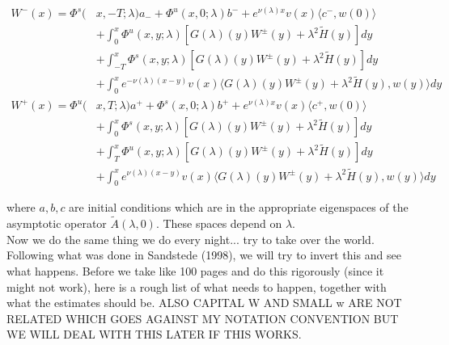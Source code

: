 \documentclass[12pt]{article}
\begin{document}
\begin{align*}
W^-(x) = \Phi^s(&x, -T; \lambda)a_- + \Phi^u(x, 0; \lambda)b^- + e^{\nu(\lambda)x} v(x) \langle c^-, w(0) \rangle  \\
&+ \int_0^x \Phi^u(x, y; \lambda)[ G(\lambda)(y)W^\pm(y) + \lambda^2 \tilde{H}(y) ] dy \\
&+ \int_{-T}^x \Phi^s(x, y; \lambda) [ G(\lambda)(y)W^\pm(y) + \lambda^2 \tilde{H}(y) ] dy \\
&+ \int_0^x 
e^{-\nu(\lambda)(x-y)} v(x) \langle G(\lambda)(y)W^\pm(y) + \lambda^2 \tilde{H}(y), w(y) \rangle dy \\
W^+(x) = \Phi^u(&x, T; \lambda)a^+ + \Phi^s(x, 0; \lambda)b^+ + e^{\nu(\lambda)x} v(x) \langle c^+, w(0) \rangle  \\
&+ \int_0^x \Phi^s(x, y; \lambda) [ G(\lambda)(y)W^\pm(y) + \lambda^2 \tilde{H}(y) ] dy \\
&+ \int_T^x \Phi^u(x, y; \lambda) [ G(\lambda)(y)W^\pm(y) + \lambda^2 \tilde{H}(y) ] dy \\
&+ \int_0^x 
e^{\nu(\lambda)(x-y)} v(x) \langle G(\lambda)(y)W^\pm(y) + \lambda^2 \tilde{H}(y), w(y) \rangle  dy
\end{align*}

where $a, b, c$ are initial conditions which are in the appropriate eigenspaces of the asymptotic operator $\tilde{A}(\lambda, 0)$. These spaces depend on $\lambda$.\\

Now we do the same thing we do every night... try to take over the world. Following what was done in Sandstede (1998), we will try to invert this and see what happens. Before we take like 100 pages and do this rigorously (since it might not work), here is a rough list of what needs to happen, together with what the estimates should be. ALSO CAPITAL W AND SMALL w ARE NOT RELATED WHICH GOES AGAINST MY NOTATION CONVENTION BUT WE WILL DEAL WITH THIS LATER IF THIS WORKS.
\end{document}
